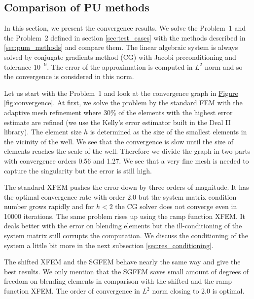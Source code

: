 \documentclass{elsarticle}
\newcommand{\prob}[1]{Problem~{#1}}
\newcommand{\fig}[1]{\hyperref[#1]{Figure \ref{#1}}}
\begin{document}
\subsection{Comparison of PU methods} \label{sec:res_comparison}
In this section, we present the convergence results. We solve the \prob{1} and the \prob{2} 
defined in section \ref{sec:test_cases} with the methods described in \ref{sec:pum_methods} and compare them.
The linear algebraic system is always solved by conjugate gradients method (CG) with Jacobi preconditioning 
and tolerance $10^{-9}$. The error of the approximation is computed in $L^2$ norm and so the convergence is
considered in this norm.

Let us start with the \prob{1} and look at the convergence graph in \fig{fig:convergence}.
At first, we solve the problem by the standard FEM with the adaptive mesh refinement where 30\% of the elements
with the highest error estimate are refined (we use the Kelly's error estimator built in the Deal II library).
The element size $h$ is determined as the size of the smallest elements in the 
vicinity of the well. We see that the convergence is slow until the size of elements reaches the scale of the
well. Therefore we divide the graph in two parts with convergence orders 0.56 and 1.27.
We see that a very fine mesh is needed to capture the singularity but the error is still high.

The standard XFEM pushes the error down by three orders of magnitude. It has the optimal convergence rate with order 2.0 but the system
matrix condition number grows rapidly and for $h<2$ the CG solver does not converge even in 10000 iterations. The same
problem rises up using the ramp function XFEM. It deals better with the error on blending elements but the
ill-conditioning of the system matrix still corrupts the computation. We discuss the conditioning of the system 
a little bit more in the next subsection \ref{sec:res_conditioning}.

The shifted XFEM and the SGFEM behave nearly the same way and give the best results. We only mention that the SGFEM saves 
small amount of degrees of freedom on blending elements in comparison with the shifted and the ramp function XFEM.
The order of convergence in $L^2$ norm closing to 2.0 is optimal.
\end{document}
